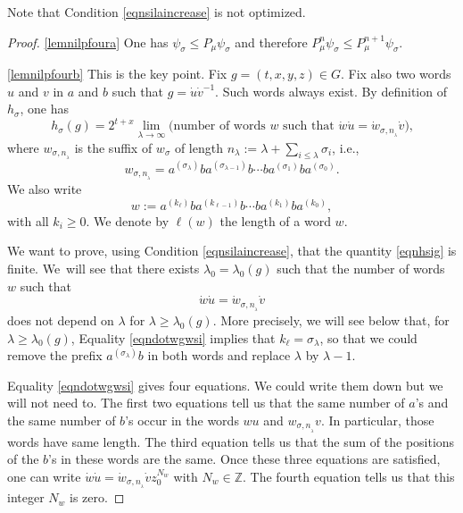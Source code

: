 \documentclass[11pt]{article}
\newcommand{\ie}{i.e.,\xspace}
\newcommand{\skpt}{\smallskip}
\numberwithin{equation}{section}
\theoremstyle{definition}
\newcommand{\m}[1]{\mathbb{ #1}}
\let\la\lambda
\let\si\sigma
\begin{document}
Note that Condition \eqref{eqnsilaincrease} is not optimized.

\skpt
\begin{proof}
\eqref{lemnilpfoura} One has $\psi_\si\leq P_\mu\psi_\si$ and therefore $P_\mu^n\psi_\si\leq P_\mu^{n+1}\psi_\si$.

\eqref{lemnilpfourb} This is the key point.
Fix $g=(t,x,y,z)\in G$.
Fix also two words $u$ and $v$ in $a$ and $b$
such that $g=\dot{u}\dot{v}^{-1}$. Such words always exist.
By definition of $h_\si$, one has
\begin{equation}
\label{eqnhsig}
h_{\si}(g)=2^{t+x} \lim_{\la\to\infty}
\text{(number of words $w$ such that $\dot{w}\dot{u}=\dot{w}_{\si,n_{_\la}}\dot{v}$),}
\end{equation}
where $w_{\si,n_{_\la}}$ is the suffix of $w_\si$
of length $n_\la:= \la+\sum_{ i\leq \la} \si_i$, \ie
\begin{equation}
\label{eqnwordwsi}
w_{\si,n_{_\la}} = a^{(\si_{\la})}ba^{(\si_{\la-1})}b\cdots ba^{(\si_1)}ba^{(\si_0)}.
\end{equation}
We also write
\begin{equation}
\label{eqnwordw}
w:= a^{(k_{\ell})}ba^{(k_{\ell-1})}b\cdots ba^{(k_1)}ba^{(k_0)},
\end{equation}
with all $k_i\geq 0$. We denote by $\ell(w)$ the length of a word $w$.

We want to prove, using Condition \eqref{eqnsilaincrease}, that the quantity \eqref{eqnhsig} is finite.
We~will see that there exists $\la_0=\la_0(g)$ such that
the number of words $w$ such that
\begin{equation}
\label{eqndotwgwsi}
\dot{w}\dot{u}=\dot{w}_{\si,n_{_\la}}\dot{v}
\end{equation}
does not depend on $\la$ for $\la\geq \la_0(g)$.
More precisely, we will see below that,
for $\la\geq \la_0(g)$,
Equality \eqref{eqndotwgwsi} implies
that $k_\ell=\si_{\la}$, so that we could remove the prefix $a^{(\si_\la)}b$
in both words and replace $\la$ by $\la\! -\! 1$.

Equality \eqref{eqndotwgwsi} gives four equations.
We could write them down but we will not need to.
The first two equations tell us that the same number of $a$'s and the same number of $b$'s
occur in the words $wu$ and $w_{\si,n_{_\la}}v$. In particular, those words have same length.
The third equation tells us that the sum of the positions of the $b$'s in these words
are the same.
Once these three equations are satisfied, one can write
$\dot{w}\dot{u}=\dot{w}_{\si,n_{_\la}}\dot{v} z_0^{N_w}$
with $N_w\in \m Z$.
The fourth equation
tells us that this integer $N_w$ is zero.


\end{proof}
\end{document}
